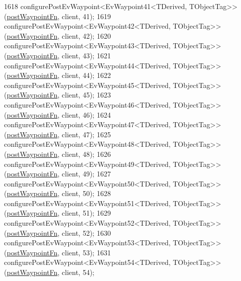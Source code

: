 \begin{DoxyCode}
1618     configurePostEvWaypoint<EvWaypoint41<TDerived, TObjectTag>>(\hyperlink{classmove__base__z__client_1_1WaypointEventDispatcher_acc538eb7506c13f7cca2268a1742dadd}{postWaypointFn}, client, 41);
1619     configurePostEvWaypoint<EvWaypoint42<TDerived, TObjectTag>>(\hyperlink{classmove__base__z__client_1_1WaypointEventDispatcher_acc538eb7506c13f7cca2268a1742dadd}{postWaypointFn}, client, 42);
1620     configurePostEvWaypoint<EvWaypoint43<TDerived, TObjectTag>>(\hyperlink{classmove__base__z__client_1_1WaypointEventDispatcher_acc538eb7506c13f7cca2268a1742dadd}{postWaypointFn}, client, 43);
1621     configurePostEvWaypoint<EvWaypoint44<TDerived, TObjectTag>>(\hyperlink{classmove__base__z__client_1_1WaypointEventDispatcher_acc538eb7506c13f7cca2268a1742dadd}{postWaypointFn}, client, 44);
1622     configurePostEvWaypoint<EvWaypoint45<TDerived, TObjectTag>>(\hyperlink{classmove__base__z__client_1_1WaypointEventDispatcher_acc538eb7506c13f7cca2268a1742dadd}{postWaypointFn}, client, 45);
1623     configurePostEvWaypoint<EvWaypoint46<TDerived, TObjectTag>>(\hyperlink{classmove__base__z__client_1_1WaypointEventDispatcher_acc538eb7506c13f7cca2268a1742dadd}{postWaypointFn}, client, 46);
1624     configurePostEvWaypoint<EvWaypoint47<TDerived, TObjectTag>>(\hyperlink{classmove__base__z__client_1_1WaypointEventDispatcher_acc538eb7506c13f7cca2268a1742dadd}{postWaypointFn}, client, 47);
1625     configurePostEvWaypoint<EvWaypoint48<TDerived, TObjectTag>>(\hyperlink{classmove__base__z__client_1_1WaypointEventDispatcher_acc538eb7506c13f7cca2268a1742dadd}{postWaypointFn}, client, 48);
1626     configurePostEvWaypoint<EvWaypoint49<TDerived, TObjectTag>>(\hyperlink{classmove__base__z__client_1_1WaypointEventDispatcher_acc538eb7506c13f7cca2268a1742dadd}{postWaypointFn}, client, 49);
1627     configurePostEvWaypoint<EvWaypoint50<TDerived, TObjectTag>>(\hyperlink{classmove__base__z__client_1_1WaypointEventDispatcher_acc538eb7506c13f7cca2268a1742dadd}{postWaypointFn}, client, 50);
1628     configurePostEvWaypoint<EvWaypoint51<TDerived, TObjectTag>>(\hyperlink{classmove__base__z__client_1_1WaypointEventDispatcher_acc538eb7506c13f7cca2268a1742dadd}{postWaypointFn}, client, 51);
1629     configurePostEvWaypoint<EvWaypoint52<TDerived, TObjectTag>>(\hyperlink{classmove__base__z__client_1_1WaypointEventDispatcher_acc538eb7506c13f7cca2268a1742dadd}{postWaypointFn}, client, 52);
1630     configurePostEvWaypoint<EvWaypoint53<TDerived, TObjectTag>>(\hyperlink{classmove__base__z__client_1_1WaypointEventDispatcher_acc538eb7506c13f7cca2268a1742dadd}{postWaypointFn}, client, 53);
1631     configurePostEvWaypoint<EvWaypoint54<TDerived, TObjectTag>>(\hyperlink{classmove__base__z__client_1_1WaypointEventDispatcher_acc538eb7506c13f7cca2268a1742dadd}{postWaypointFn}, client, 54);

\end{DoxyCode}
